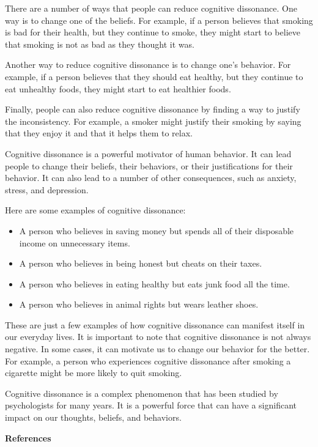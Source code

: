 \documentclass[
]{book}
\begin{document}
There are a number of ways that people can reduce cognitive dissonance. One way is to change one of the beliefs. For example, if a person believes that smoking is bad for their health, but they continue to smoke, they might start to believe that smoking is not as bad as they thought it was.

Another way to reduce cognitive dissonance is to change one's behavior. For example, if a person believes that they should eat healthy, but they continue to eat unhealthy foods, they might start to eat healthier foods.

Finally, people can also reduce cognitive dissonance by finding a way to justify the inconsistency. For example, a smoker might justify their smoking by saying that they enjoy it and that it helps them to relax.

Cognitive dissonance is a powerful motivator of human behavior. It can lead people to change their beliefs, their behaviors, or their justifications for their behavior. It can also lead to a number of other consequences, such as anxiety, stress, and depression.

Here are some examples of cognitive dissonance:

\begin{itemize}
\item
  A person who believes in saving money but spends all of their disposable income on unnecessary items.
\item
  A person who believes in being honest but cheats on their taxes.
\item
  A person who believes in eating healthy but eats junk food all the time.
\item
  A person who believes in animal rights but wears leather shoes.
\end{itemize}

These are just a few examples of how cognitive dissonance can manifest itself in our everyday lives. It is important to note that cognitive dissonance is not always negative. In some cases, it can motivate us to change our behavior for the better. For example, a person who experiences cognitive dissonance after smoking a cigarette might be more likely to quit smoking.

Cognitive dissonance is a complex phenomenon that has been studied by psychologists for many years. It is a powerful force that can have a significant impact on our thoughts, beliefs, and behaviors.

\textbf{References}
\end{document}
